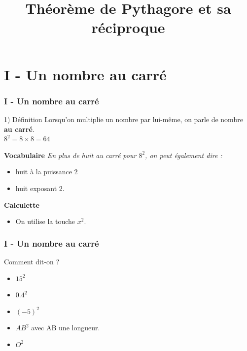 \documentclass{beamer}
\title{Théorème de Pythagore et sa réciproque}
\begin{document}
\frame{\titlepage}

\section{I - Un nombre au carré}
\begin{frame}
  \frametitle{I - Un nombre au carré}

  \begin{block}{1) Définition}
    Lorsqu'on multiplie un nombre par lui-même, on parle de nombre \textbf{au carré}.\\
    $8^2 = 8 \times 8 = 64$
  \end{block}

  \textbf{Vocabulaire}
  \textit{En plus de huit au carré pour $8^2$, on peut également dire :}
  \begin{itemize}	
  \item huit à la puissance 2
  \item huit exposant 2.
  \end{itemize}
  \textbf{Calculette}
  \begin{itemize}	
  \item On utilise la touche $x^2$.
  \end{itemize}
\end{frame}

\begin{frame}
  \frametitle{I - Un nombre au carré}

  \begin{exampleblock}{}
    Comment dit-on ?
  \end{exampleblock}

  \begin{itemize}	
  \item $15^2$
  \item $0.4^2$
  \item $(-5)^2$ 
  \item $AB^2$ avec AB une longueur.
  \item $O^2$
  \end{itemize}

\end{frame}
\end{document}
